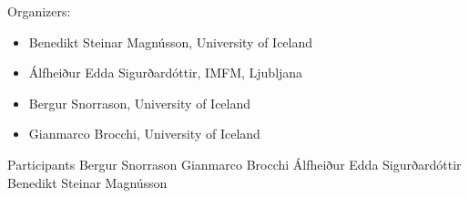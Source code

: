 \documentclass[12pt,openany]{report}      %
\begin{document}
\vfill
\vfill
\noindent
Organizers:
\begin{itemize}
    \setlength\itemsep{-0.3 em}
    \item Benedikt Steinar Magnússon, University of Iceland
    \item Álfheiður Edda Sigurðardóttir, IMFM, Ljubljana
    \item Bergur Snorrason, University of Iceland
    \item Gianmarco Brocchi, University of Iceland
\end{itemize}
\vfill

\pagebreak

\newcommand\talk[3]{%
    \vspace{3 ex}
    \noindent
    \textsc{\large #1}

    \smallskip
    \noindent
    \textbf{\textit{#2}}

    \medskip
    \noindent
    #3

}




\pagebreak



\pagebreak



\restoregeometry


\newpage
{\LARGE Participants}
Bergur Snorrason
Gianmarco Brocchi
Álfheiður Edda Sigurðardóttir
Benedikt Steinar Magnússon 

\newpage
\end{document}
